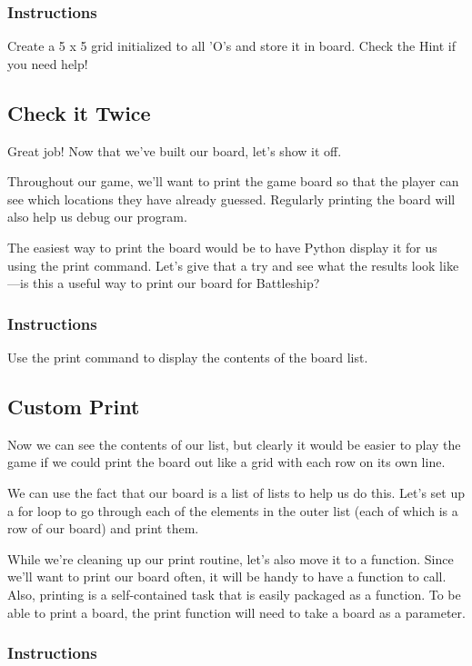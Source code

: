 \documentclass[12pt,a4paper,final,twoside,onecolumn,titlepage]{book}
\begin{document}
\subsubsection{Instructions}

Create a 5 x 5 grid initialized to all 'O's and store it in board. Check the Hint if you need help!

\subsection{Check it Twice}

Great job! Now that we've built our board, let's show it off.

Throughout our game, we'll want to print the game board so that the player can see which locations they have already guessed. Regularly printing the board will also help us debug our program.

The easiest way to print the board would be to have Python display it for us using the print command. Let's give that a try and see what the results look like—is this a useful way to print our board for Battleship?
\subsubsection{Instructions}

Use the print command to display the contents of the board list.

\subsection{Custom Print}

Now we can see the contents of our list, but clearly it would be easier to play the game if we could print the board out like a grid with each row on its own line.

We can use the fact that our board is a list of lists to help us do this. Let's set up a for loop to go through each of the elements in the outer list (each of which is a row of our board) and print them.

While we're cleaning up our print routine, let's also move it to a function. Since we'll want to print our board often, it will be handy to have a function to call. Also, printing is a self-contained task that is easily packaged as a function. To be able to print a board, the print function will need to take a board as a parameter.
\subsubsection{Instructions}
\end{document}
